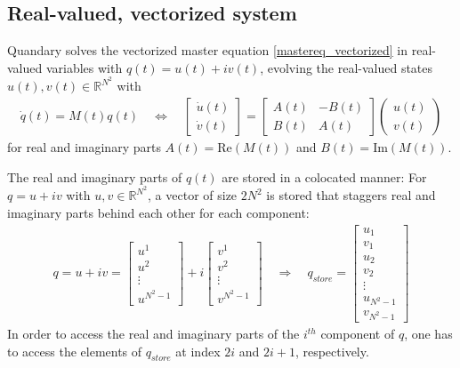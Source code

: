 \documentclass[11pt]{article}
\newcommand{\R}{\mathds{R}}
\begin{document}
  \subsection{Real-valued, vectorized system}
   Quandary solves the vectorized master equation \eqref{mastereq_vectorized} in
   real-valued variables with $q(t) = u(t) + iv(t)$, evolving the real-valued
   states $u(t), v(t)\in \R^{N^2}$ with
   \begin{align}
     \dot q(t) = M(t) q(t) \quad \Leftrightarrow \quad \begin{bmatrix} \dot u(t) \\ \dot v(t) \end{bmatrix} = 
   \begin{bmatrix} A(t) & -B(t) \\ B(t) & A(t) \end{bmatrix} 
   \begin{pmatrix} u(t) \\ v(t) \end{pmatrix} 
   \label{realvaluedODE}
   \end{align}
   for real and imaginary parts $A(t) = \mbox{Re} \left(M(t)\right)$ and $B(t) = \mbox{Im}\left(M(t)\right)$. 

The real and imaginary parts of $q(t)$ are stored in a colocated manner: For
  $q = u+iv$ with $u,v\in\R^{N^2}$, a vector of size $2N^2$ is stored that
  staggers real and imaginary parts behind each other for each component:
  \begin{align*}
    q = u+iv = \begin{bmatrix}
     u^1\\u^2\\ \vdots \\ u^{N^2-1} 
    \end{bmatrix}
    + i \begin{bmatrix}
     v^1\\v^2\\ \vdots \\ v^{N^2-1} 
    \end{bmatrix}
    \quad \Rightarrow \quad
    q_{store} = \begin{bmatrix}
      u_1 \\ v_1\\ u_2 \\ v_2 \\ \vdots \\ u_{N^2-1} \\ v_{N^2-1}
    \end{bmatrix}
  \end{align*}
  In order to access the real and imaginary parts of the $i^{th}$ component of
  $q$, one has to access the elements of $q_{store}$ at index $2i$ and $2i+1$,
  respectively. 
\end{document}
